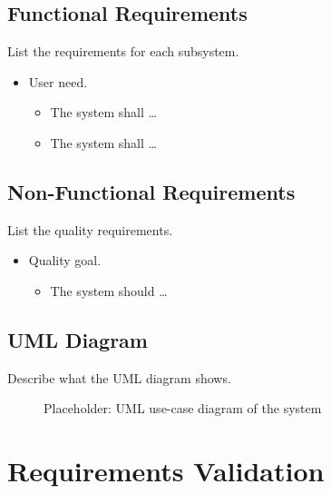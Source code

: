 \documentclass[
  12pt,
  a4paper,
]{report}
\providecommand{\tightlist}{%
  \setlength{\itemsep}{0pt}\setlength{\parskip}{0pt}}
\begin{document}
\subsection{Functional Requirements}\label{functional-requirements}

List the requirements for each subsystem.

\begin{itemize}
\tightlist
\item
  User need.

  \begin{itemize}
  \tightlist
  \item
    The system shall \ldots{}
  \item
    The system shall \ldots{}
  \end{itemize}
\end{itemize}

\subsection{Non-Functional
Requirements}\label{non-functional-requirements}

List the quality requirements.

\begin{itemize}
\tightlist
\item
  Quality goal.

  \begin{itemize}
  \tightlist
  \item
    The system should \ldots{}
  \end{itemize}
\end{itemize}

\subsection{UML Diagram}\label{uml-diagram}

Describe what the UML diagram shows.

\begin{figure}
\centering
{}
\caption{Placeholder: UML use-case diagram of the system}
\end{figure}

\section{Requirements Validation}\label{requirements-validation}
\end{document}

